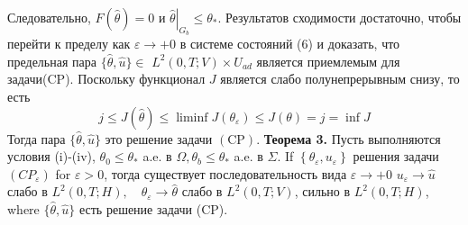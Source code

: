Следовательно, $F(\widehat{\theta})=0$ и $\left.\widehat{\theta}\right|_{G_{b}} \leq \theta_{*}$.
Результатов сходимости достаточно, чтобы перейти к пределу как $\varepsilon \rightarrow+0$
в системе состояний (6) и доказать, что предельная пара
$\{\widehat{\theta}, \widehat{u}\} \in$ $L^{2}(0, T ; V) \times U_{a d}$
является приемлемым для задачи(CP).
Поскольку функционал $J$ является слабо полунепрерывным снизу, то есть
\[
    j \leq J(\widehat{\theta}) \leq \liminf J\left(\theta_{\varepsilon}\right) \leq J(\theta)=j=\inf J
\]
Тогда пара $\{\widehat{\theta}, \widehat{u}\}$ это решение задачи $(\mathrm{CP})$.
\textbf{Теорема 3.} Пусть выполняются условия (i)-(iv),
$\theta_{0} \leq \theta_{*}$ a.e. в $\Omega, \theta_{b} \leq \theta_{*}$ a.e.
в
$\Sigma$.
If $\left\{\theta_{\varepsilon}, u_{\varepsilon}\right\}$  решения задачи
$\left(C P_{\varepsilon}\right)$ for $\varepsilon>0$, тогда существует последовательность вида
$\varepsilon \rightarrow+0$ $u_{\varepsilon} \rightarrow \widehat{u}$ слабо в
$L^{2}(0, T ; H), \quad \theta_{\varepsilon} \rightarrow \widehat{\theta}$
слабо в $L^{2}(0, T ; V)$,
сильно в $L^{2}(0, T ; H)$, where $\{\widehat{\theta}, \widehat{u}\}$ есть решение задачи (CP).
